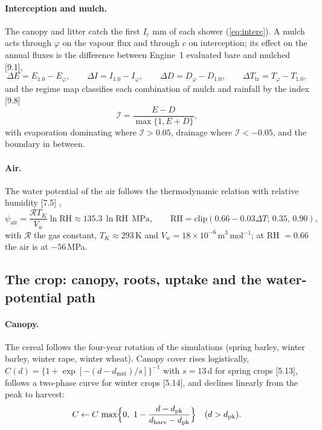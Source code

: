 \documentclass[preprint,12pt]{elsarticle}
\begin{document}
\paragraph{Interception and mulch.} The canopy and litter catch the first $I_c$ mm of each shower (\cref{eq:interc}). A mulch acts through $\varphi$ on the vapour flux and through $c$ on interception; its effect on the annual fluxes is the difference between Engine~1 evaluated bare and mulched [9.1],
\begin{equation}
\Delta E=E_{1.0}-E_\varphi,\qquad \Delta I=I_{1.0}-I_\varphi,\qquad \Delta D=D_\varphi-D_{1.0},\qquad \Delta T_{\mathrm{tr}}=T_\varphi-T_{1.0},
\label{eq:mulchdelta}
\end{equation}
and the regime map classifies each combination of mulch and rainfall by the index [9.8]
\begin{equation}
\mathcal I=\frac{E-D}{\max\{1,E+D\}},
\label{eq:regime}
\end{equation}
with evaporation dominating where $\mathcal I>0.05$, drainage where $\mathcal I<-0.05$, and the boundary in between.

\paragraph{Air.} The water potential of the air follows the thermodynamic relation with relative humidity [7.5] \cite{Nobel2009},
\begin{equation}
\psi_{\mathrm{air}}=\frac{\mathcal RT_K}{V_w}\ln\mathrm{RH}\approx135.3\,\ln\mathrm{RH}\ \ \mathrm{MPa},\qquad \mathrm{RH}=\mathrm{clip}(0.66-0.03\Delta T;\,0.35,\,0.90),
\label{eq:psiair}
\end{equation}
with $\mathcal R$ the gas constant, $T_K\approx293$\,K and $V_w=18\times10^{-6}$\,m$^3$\,mol$^{-1}$; at RH $=0.66$ the air is at $-56$\,MPa.

\subsection{The crop: canopy, roots, uptake and the water-potential path}
\label{sec:sys-plant}
\paragraph{Canopy.} The cereal follows the four-year rotation of the simulations (spring barley, winter barley, winter rape, winter wheat). Canopy cover rises logistically, $C(d)=\{1+\exp[-(d-d_{\mathrm{mid}})/s]\}^{-1}$ with $s=13$\,d for spring crops [5.13], follows a two-phase curve for winter crops [5.14], and declines linearly from the peak to harvest:
\begin{equation}
C\leftarrow C\,\max\Bigl\{0,\ 1-\frac{d-d_{\mathrm{pk}}}{d_{\mathrm{harv}}-d_{\mathrm{pk}}}\Bigr\}\quad(d>d_{\mathrm{pk}}).
\label{eq:cover}
\end{equation}
\end{document}

